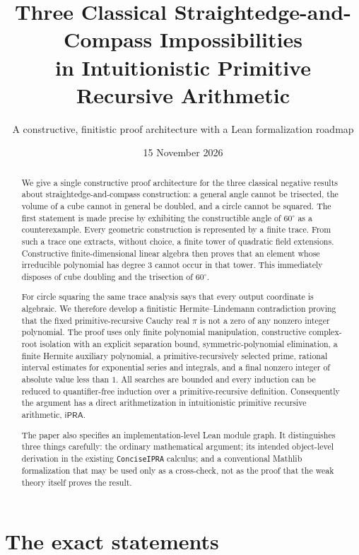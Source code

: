 \documentclass[11pt]{article}
\title{Three Classical Straightedge-and-Compass Impossibilities\\
       in Intuitionistic Primitive Recursive Arithmetic}
\author{A constructive, finitistic proof architecture with a Lean formalization roadmap}
\date{15 November 2026}
\newcommand{\ipra}{\mathsf{iPRA}}
\begin{document}
\maketitle

\begin{abstract}
We give a single constructive proof architecture for the three classical negative results about straightedge-and-compass construction: a general angle cannot be trisected, the volume of a cube cannot in general be doubled, and a circle cannot be squared.  The first statement is made precise by exhibiting the constructible angle of $60^\circ$ as a counterexample.  Every geometric construction is represented by a finite trace.  From such a trace one extracts, without choice, a finite tower of quadratic field extensions.  Constructive finite-dimensional linear algebra then proves that an element whose irreducible polynomial has degree $3$ cannot occur in that tower.  This immediately disposes of cube doubling and the trisection of $60^\circ$.

For circle squaring the same trace analysis says that every output coordinate is algebraic.  We therefore develop a finitistic Hermite--Lindemann contradiction proving that the fixed primitive-recursive Cauchy real $\pi$ is not a zero of any nonzero integer polynomial.  The proof uses only finite polynomial manipulation, constructive complex-root isolation with an explicit separation bound, symmetric-polynomial elimination, a finite Hermite auxiliary polynomial, a primitive-recursively selected prime, rational interval estimates for exponential series and integrals, and a final nonzero integer of absolute value less than $1$.  All searches are bounded and every induction can be reduced to quantifier-free induction over a primitive-recursive definition.  Consequently the argument has a direct arithmetization in intuitionistic primitive recursive arithmetic, $\ipra$.

The paper also specifies an implementation-level Lean module graph.  It distinguishes three things carefully: the ordinary mathematical argument; its intended object-level derivation in the existing \texttt{ConciseIPRA} calculus; and a conventional Mathlib formalization that may be used only as a cross-check, not as the proof that the weak theory itself proves the result.
\end{abstract}

\tableofcontents
\newpage

\section{The exact statements}
\end{document}
